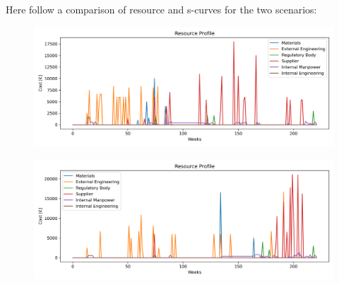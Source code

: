 Here follow a comparison of resource and s-curves for the two scenarios:

\begin{figure}[p]
    \begin{minipage}{\textwidth}
        \centering
        \includegraphics[width=\textwidth]{../resource_profile_E.png}
        \label{fig:resource_profile_early}
    \end{minipage}\hfill
    \begin{minipage}{\textwidth}
        \centering
        \includegraphics[width=\textwidth]{../resource_profile_L.png}
        \label{fig:resource_profile_late}
    \end{minipage}
\end{figure}

